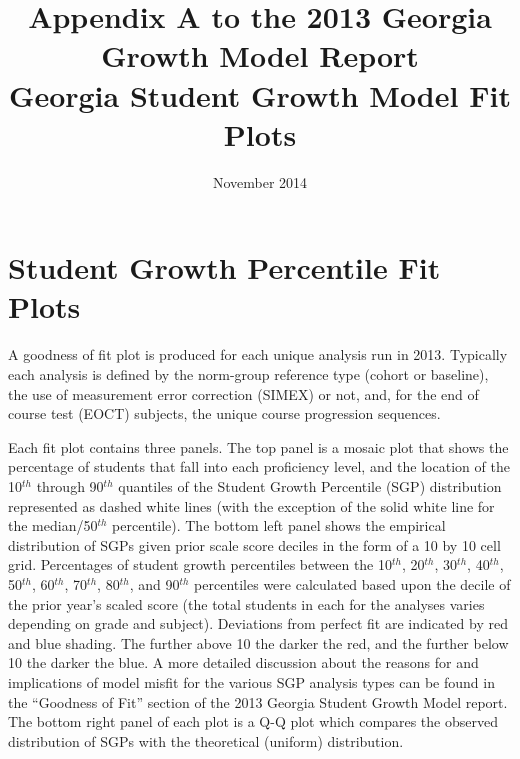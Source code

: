 \documentclass[12pt]{article}
\begin{document}
\newcommand{\pl}[1]{\textsf{PL#1}}
\newcommand{\Cov}{\ensuremath{\mbox{\textsf{Cov}}}}
\newcommand{\Diag}{\ensuremath{\mbox{\textsf{Diag}}}}
\newcommand{\Bias}{\ensuremath{\mbox{\textsf{Bias}}}}
\newcommand{\Astar}[1]{\ensuremath{#1^{^*}}}
\thispagestyle{plain}
\pagestyle{damian}

\title{\textsf{\LARGE Appendix A to the 2013 Georgia Growth Model Report  \\\medskip Georgia Student Growth Model Fit Plots }}
\author{}

 \date{November 2014} 

\maketitle

\newpage


\section{Student Growth Percentile Fit
Plots}\label{student-growth-percentile-fit-plots}

A goodness of fit plot is produced for each unique analysis run in 2013.
Typically each analysis is defined by the norm-group reference type
(cohort or baseline), the use of measurement error correction (SIMEX) or
not, and, for the end of course test (EOCT) subjects, the unique course
progression sequences.

Each fit plot contains three panels. The top panel is a mosaic plot that
shows the percentage of students that fall into each proficiency level,
and the location of the 10\(^{th}\) through 90\(^{th}\) quantiles of the
Student Growth Percentile (SGP) distribution represented as dashed white
lines (with the exception of the solid white line for the
median/50\(^{th}\) percentile). The bottom left panel shows the
empirical distribution of SGPs given prior scale score deciles in the
form of a 10 by 10 cell grid. Percentages of student growth percentiles
between the 10\(^{th}\), 20\(^{th}\), 30\(^{th}\), 40\(^{th}\),
50\(^{th}\), 60\(^{th}\), 70\(^{th}\), 80\(^{th}\), and 90\(^{th}\)
percentiles were calculated based upon the decile of the prior year's
scaled score (the total students in each for the analyses varies
depending on grade and subject). Deviations from perfect fit are
indicated by red and blue shading. The further above 10 the darker the
red, and the further below 10 the darker the blue. A more detailed
discussion about the reasons for and implications of model misfit for
the various SGP analysis types can be found in the ``Goodness of Fit''
section of the 2013 Georgia Student Growth Model report. The bottom
right panel of each plot is a Q-Q plot which compares the observed
distribution of SGPs with the theoretical (uniform) distribution.
\end{document}
